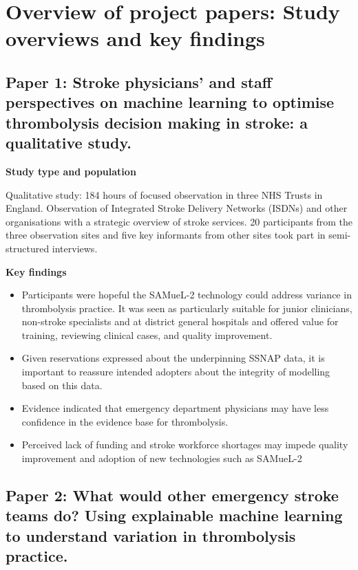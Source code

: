 \section{Overview of project papers: Study overviews and key findings}
\label{sec:papers}

\subsection{Paper 1: Stroke physicians' and staff perspectives on machine learning to optimise thrombolysis decision making in stroke: a qualitative study. \cite{jarvie_stroke_2024}}

\textbf{Study type and population}

Qualitative study: 184 hours of focused observation in three NHS Trusts in England. Observation of Integrated Stroke Delivery Networks (ISDNs) and other organisations with a strategic overview of stroke services. 20 participants from the three observation sites and five key informants from other sites took part in semi-structured interviews.

\textbf{Key findings}

\begin{itemize}
    \item Participants were hopeful the SAMueL-2 technology could address variance in thrombolysis practice. It was seen as particularly suitable for junior clinicians, non-stroke specialists and at district general hospitals and offered value for training, reviewing clinical cases, and quality improvement.

    \item Given reservations expressed about the underpinning SSNAP data, it is important to reassure intended adopters about the integrity of modelling based on this data.

    \item Evidence indicated that emergency department physicians may have less confidence in the evidence base for thrombolysis.

    \item Perceived lack of funding and stroke workforce shortages may impede quality improvement and adoption of new technologies such as SAMueL-2

\end{itemize}


\subsection{Paper 2: What would other emergency stroke teams do? Using explainable machine learning to understand variation in thrombolysis practice.\cite{pearn_what_2023}}

